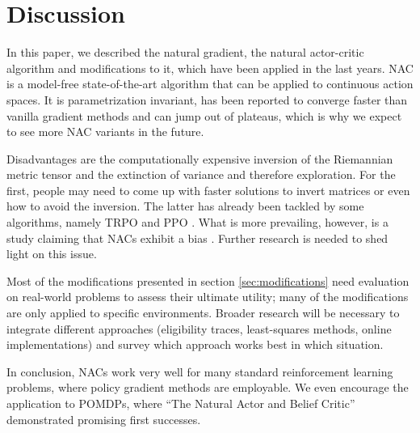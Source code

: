 
\section{Discussion}
\label{sec:discussion}

In this paper, we described the natural gradient, the natural actor-critic algorithm and modifications to it, which have been applied in the last years. NAC is a model-free state-of-the-art algorithm that can be applied to continuous action spaces. It is parametrization invariant, has been reported to converge faster than vanilla gradient methods and can jump out of plateaus, which is why we expect to see more NAC variants in the future. 

Disadvantages are the computationally expensive inversion of the Riemannian metric tensor and the extinction of variance and therefore exploration. For the first, people may need to come up with faster solutions to invert matrices or even how to avoid the inversion. The latter has already been tackled by some algorithms, namely TRPO \citep{schulman2015trust} and PPO \citep{schulman2017proximal}. What is more prevailing, however, is a study claiming that NACs exhibit a bias \cite{thomas2014bias}. Further research is needed to shed light on this issue.

Most of the modifications presented in section \ref{sec:modifications} need evaluation on real-world problems to assess their ultimate utility; many of the modifications are only applied to specific environments. Broader research will be necessary to integrate different approaches (eligibility traces, least-squares methods, online implementations) and survey which approach works best in which situation.

In conclusion, NACs work very well for many standard reinforcement learning problems, where policy gradient methods are employable. We even encourage the application to POMDPs, where ``The Natural Actor and Belief Critic'' \cite{jurvcivcek2011natural} demonstrated promising first successes.

\newpage



